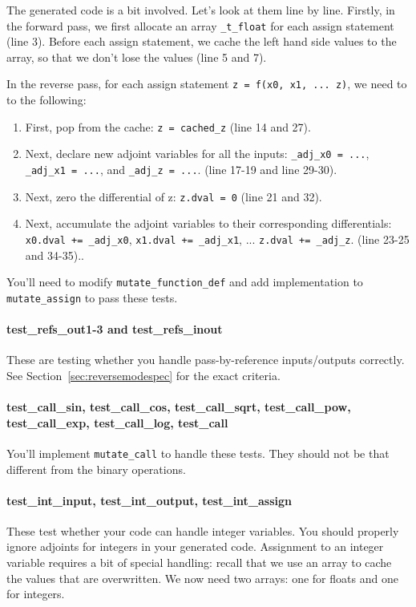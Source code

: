 The generated code is a bit involved. Let's look at them line by line. Firstly, in the forward pass, we
first allocate an array \lstinline{_t_float} for each assign statement (line 3). Before each assign statement, we cache the left hand side values to the array, so that we don't lose the values (line 5 and 7).

In the reverse pass, for each assign statement \lstinline{z = f(x0, x1, ... z)}, we need to to the following:
\begin{enumerate}
	\item First, pop from the cache: \lstinline{z = cached_z} (line 14 and 27).
	\item Next, declare new adjoint variables for all the inputs: \lstinline{_adj_x0 = ...}, \lstinline{_adj_x1 = ...}, and \lstinline{_adj_z = ...}. (line 17-19 and line 29-30).
	\item Next, zero the differential of z: \lstinline{z.dval = 0} (line 21 and 32).
	\item Next, accumulate the adjoint variables to their corresponding differentials: \lstinline{x0.dval += _adj_x0}, \lstinline{x1.dval += _adj_x1}, ... \lstinline{z.dval += _adj_z}. (line 23-25 and 34-35)..
\end{enumerate}

You'll need to modify \lstinline{mutate_function_def} and add implementation to \lstinline{mutate_assign} to pass these tests.

\paragraph{test_refs_out1-3 and test_refs_inout} These are testing whether you handle pass-by-reference inputs/outputs correctly. See Section~\ref{sec:reversemodespec} for the exact criteria.

\paragraph{test_call_sin, test_call_cos, test_call_sqrt, test_call_pow, test_call_exp, test_call_log, test_call} You'll implement \lstinline{mutate_call} to handle these tests. They should not be that different from the binary operations.

\paragraph{test_int_input, test_int_output, test_int_assign} These test whether your code can handle integer variables. You should properly ignore adjoints for integers in your generated code. Assignment to an integer variable requires a bit of special handling: recall that we use an array to cache the values that are overwritten. We now need two arrays: one for floats and one for integers.

